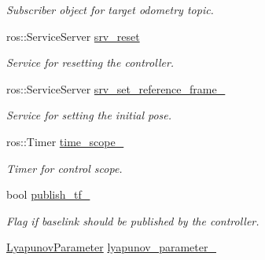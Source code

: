 \begin{DoxyCompactItemize}
\begin{DoxyCompactList}\small\item\em Subscriber object for target odometry topic. \end{DoxyCompactList}\item 
ros\+::\+Service\+Server \hyperlink{classController_a06c03b4a779d0c6cfcacef97eb36c6bd}{srv\+\_\+reset}\hypertarget{classController_a06c03b4a779d0c6cfcacef97eb36c6bd}{}\label{classController_a06c03b4a779d0c6cfcacef97eb36c6bd}

\begin{DoxyCompactList}\small\item\em Service for resetting the controller. \end{DoxyCompactList}\item 
ros\+::\+Service\+Server \hyperlink{classController_aa6d4e4893dfa04d1d4c26e2610a55536}{srv\+\_\+set\+\_\+reference\+\_\+frame\+\_\+}\hypertarget{classController_aa6d4e4893dfa04d1d4c26e2610a55536}{}\label{classController_aa6d4e4893dfa04d1d4c26e2610a55536}

\begin{DoxyCompactList}\small\item\em Service for setting the initial pose. \end{DoxyCompactList}\item 
ros\+::\+Timer \hyperlink{classController_a96e34ca6ebe5b7c8035982ff98270f4b}{time\+\_\+scope\+\_\+}\hypertarget{classController_a96e34ca6ebe5b7c8035982ff98270f4b}{}\label{classController_a96e34ca6ebe5b7c8035982ff98270f4b}

\begin{DoxyCompactList}\small\item\em Timer for control scope. \end{DoxyCompactList}\item 
bool \hyperlink{classController_a6868c645d9ede6af828f392d3f68f48a}{publish\+\_\+tf\+\_\+}\hypertarget{classController_a6868c645d9ede6af828f392d3f68f48a}{}\label{classController_a6868c645d9ede6af828f392d3f68f48a}

\begin{DoxyCompactList}\small\item\em Flag if baselink should be published by the controller. \end{DoxyCompactList}\item 
\hyperlink{structController_1_1LyapunovParameter}{Lyapunov\+Parameter} \hyperlink{classController_ae4c22820ec1b8043a126a5c64048ec97}{lyapunov\+\_\+parameter\+\_\+}\hypertarget{classController_ae4c22820ec1b8043a126a5c64048ec97}{}\label{classController_ae4c22820ec1b8043a126a5c64048ec97}


\end{DoxyCompactItemize}
